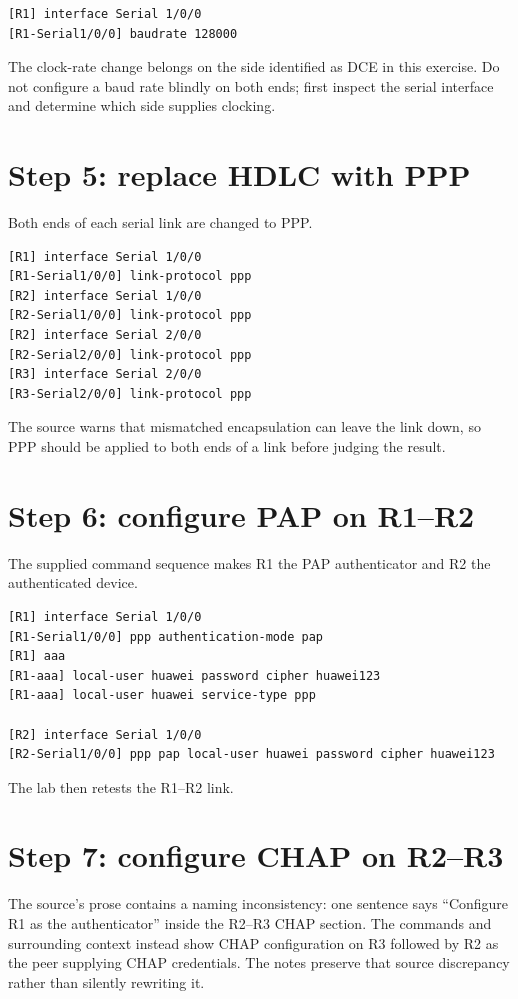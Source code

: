 
\begin{lstlisting}[style=dcnterminal]
[R1] interface Serial 1/0/0
[R1-Serial1/0/0] baudrate 128000
\end{lstlisting}

\begin{keyidea}
The clock-rate change belongs on the side identified as DCE in this exercise. Do not configure a baud rate blindly on both ends; first inspect the serial interface and determine which side supplies clocking.
\end{keyidea}

\section{Step 5: replace HDLC with PPP}
Both ends of each serial link are changed to PPP.
\begin{lstlisting}[style=dcnterminal]
[R1] interface Serial 1/0/0
[R1-Serial1/0/0] link-protocol ppp
[R2] interface Serial 1/0/0
[R2-Serial1/0/0] link-protocol ppp
[R2] interface Serial 2/0/0
[R2-Serial2/0/0] link-protocol ppp
[R3] interface Serial 2/0/0
[R3-Serial2/0/0] link-protocol ppp
\end{lstlisting}
The source warns that mismatched encapsulation can leave the link down, so PPP should be applied to both ends of a link before judging the result.

\section{Step 6: configure PAP on R1--R2}
The supplied command sequence makes R1 the PAP authenticator and R2 the authenticated device.
\begin{lstlisting}[style=dcnterminal]
[R1] interface Serial 1/0/0
[R1-Serial1/0/0] ppp authentication-mode pap
[R1] aaa
[R1-aaa] local-user huawei password cipher huawei123
[R1-aaa] local-user huawei service-type ppp

[R2] interface Serial 1/0/0
[R2-Serial1/0/0] ppp pap local-user huawei password cipher huawei123
\end{lstlisting}
The lab then retests the R1--R2 link.

\section{Step 7: configure CHAP on R2--R3}
The source's prose contains a naming inconsistency: one sentence says ``Configure R1 as the authenticator'' inside the R2--R3 CHAP section. The commands and surrounding context instead show CHAP configuration on R3 followed by R2 as the peer supplying CHAP credentials. The notes preserve that source discrepancy rather than silently rewriting it.

